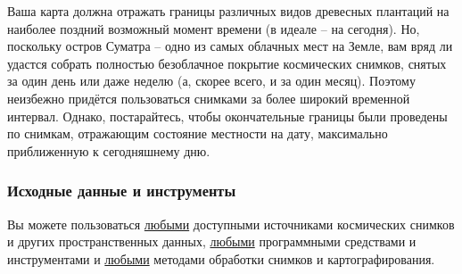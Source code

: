 Ваша карта должна отражать границы различных видов древесных плантаций на наиболее поздний возможный момент времени (в идеале – на сегодня). Но, поскольку остров Суматра – одно из самых облачных мест на Земле, вам вряд ли удастся собрать полностью безоблачное покрытие космических снимков, снятых за один день или даже неделю (а, скорее всего, и за один месяц). Поэтому неизбежно придётся пользоваться снимками за более широкий временной интервал. Однако, постарайтесь, чтобы окончательные границы были проведены по снимкам, отражающим состояние местности на дату, максимально приближенную к сегодняшнему дню.

\subsubsection*{Исходные данные и инструменты}

Вы можете пользоваться \underline{любыми} доступными источниками космических снимков и других пространственных данных, \underline{любыми} программными средствами и инструментами и \underline{любыми} методами обработки снимков и картографирования.


